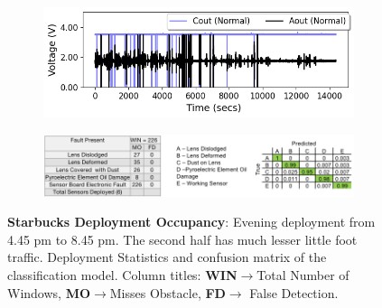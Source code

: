 \begin{figure}
	\begin{subfigure}[t]{0.4\textwidth}
		\centering
		\includegraphics[width=\textwidth]{figures/deployment/coffee_shop/starbucks_4hr_deployment.png}
		\caption{}
		\label{fig:deployment_starbucks}
	\end{subfigure}\hfill%
	\begin{subfigure}[b]{0.59\textwidth}
	    \centering
	    \includegraphics[width=\columnwidth]{figures/deployment/coffee_shop/confusion-matrix-coffeeshop-camera-ready.png}
	    \caption{}
	    \label{fig:coffeeshop_classification_results}
	\end{subfigure}
	\caption{\footnotesize \textbf{Starbucks Deployment Occupancy}: Evening deployment from 4.45 pm to 8.45 pm. The second half has much lesser little foot traffic. \cb Deployment Statistics and confusion matrix of the classification model. Column titles: \textbf{WIN}$\rightarrow$Total Number of Windows, \textbf{MO}$\rightarrow$Misses Obstacle, \textbf{FD}$\rightarrow$ False Detection. }
\end{figure}




